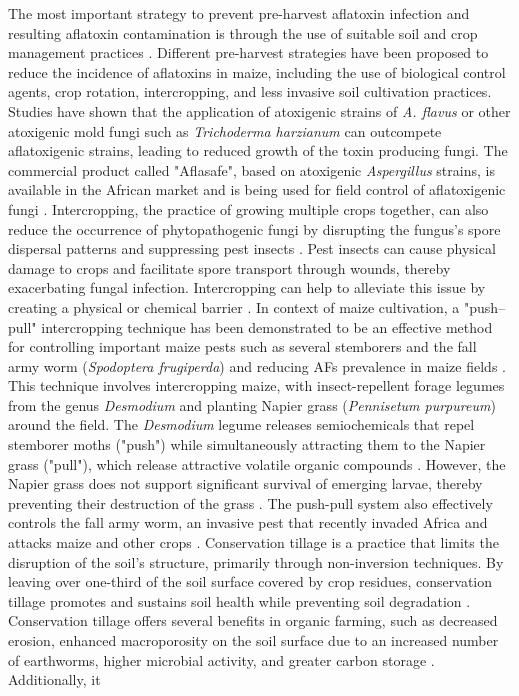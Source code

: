 \begin{refsection}
The most important strategy to prevent pre-harvest aflatoxin infection and resulting aflatoxin contamination is through the use of suitable soil and crop management practices \citep{fouche2020aflatoxins, verheecke2016microbial}. Different pre-harvest strategies have been proposed to reduce the incidence of aflatoxins in maize, including the use of biological control agents, crop rotation, intercropping, and less invasive soil cultivation practices. Studies have shown that the application of atoxigenic strains of \textit{A. flavus} \citep{probst2011identification} or other atoxigenic mold fungi such as \textit{Trichoderma harzianum} \citep{ren2022potential, dania2020using, sivparsad2016pre} can outcompete aflatoxigenic strains, leading to reduced growth of the toxin producing fungi. The commercial product called "Aflasafe", based on atoxigenic \textit{Aspergillus} strains, is available in the African market and is being used for field control of aflatoxigenic fungi \citep{migwi2020assessment, bandyopadhyay2016biological}.  Intercropping, the practice of growing multiple crops together, can also reduce the occurrence of phytopathogenic fungi by disrupting the fungus's spore dispersal patterns and suppressing pest insects \citep{trenbath1993intercropping, langer2007intercropping}. Pest insects can cause physical damage to crops and facilitate spore transport through wounds, thereby exacerbating fungal infection. Intercropping can help to alleviate this issue by creating a physical or chemical barrier \citep{trenbath1993intercropping, langer2007intercropping}. In context of maize cultivation, a "push–pull" intercropping technique has been demonstrated to be an effective method for controlling important maize pests such as several stemborers and the fall army worm (\textit{Spodoptera frugiperda}) and reducing AFs prevalence in maize fields \citep{njeru2020impact}. This technique involves intercropping maize, with insect-repellent forage legumes from the genus \textit{Desmodium} and planting Napier grass (\textit{Pennisetum purpureum}) around the field. The \textit{Desmodium} legume releases semiochemicals that repel stemborer moths ("push") while simultaneously attracting them to the Napier grass ("pull"), which release attractive volatile organic compounds \citep{njeru2020impact, khan2000exploiting, khan2011push}. However, the Napier grass does not support significant survival of emerging larvae, thereby preventing their destruction of the grass \citep{njeru2020impact, khan2011push}. The push-pull system also effectively controls the fall army worm, an invasive pest that recently invaded Africa and attacks maize and other crops \citep{njeru2020impact, khan2011push}. Conservation tillage is a practice that limits the disruption of the soil's structure, primarily through non-inversion techniques. By leaving over one-third of the soil surface covered by crop residues, conservation tillage promotes and sustains soil health while preventing soil degradation \citep{peigne2007conservation}. Conservation tillage offers several benefits in organic farming, such as decreased erosion, enhanced macroporosity on the soil surface due to an increased number of earthworms, higher microbial activity, and greater carbon storage \citep{busari2015conservation}. Additionally, it 
\end{refsection}

